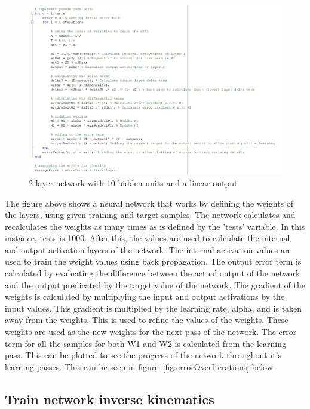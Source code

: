 \documentclass [11pt]{article}
\begin{document}
\begin{figure}[H]
\centerline{\includegraphics[width=15cm]{Neural_network_training}}
\caption{2-layer network with 10 hidden units and a linear output}
\label{fig:2-layer_network}
\end{figure}

The figure above shows a neural network that works by defining the weights of the layers, using given training and target samples. The network calculates and recalculates the weights as many times as is defined by the 'tests' variable. In this instance, tests is 1000. After this, the values are used to calculate the internal and output activation layers of the network.  The internal activation values are used to train the weight values using back propagation. The output error term is calculated by evaluating the difference between the actual output of the network and the output predicated by the target value of the network. The gradient of the weights is calculated by multiplying the input and output activations by the input values. This gradient is multiplied by the learning rate, alpha, and is taken away from the weights. This is used to refine the values of the weights. These weights are used as the new weights for the next pass of the network. The error term for all the samples for both W1 and W2 is calculated from the learning pass. This can be plotted to see the progress of the network throughout it's learning passes. This can be seen in figure~\ref{fig:errorOverIterations} below.


\subsection{Train network inverse kinematics}
\end{document}
